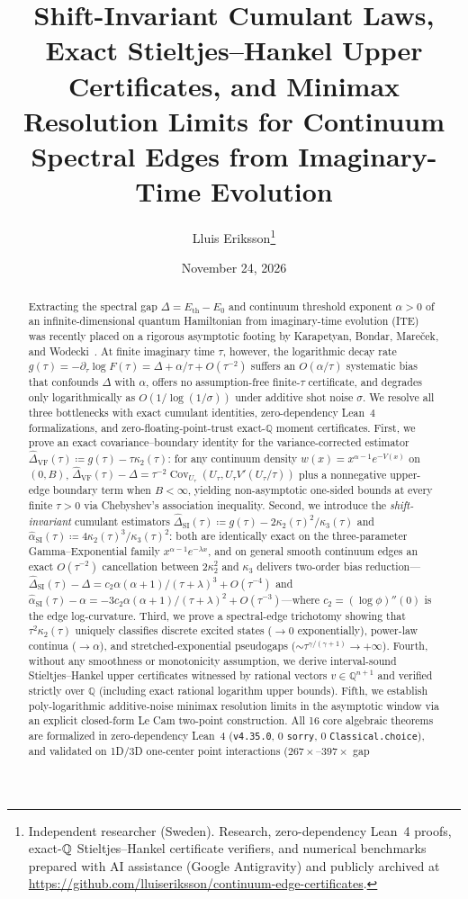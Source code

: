 \documentclass[11pt,a4paper]{article}
\title{\textbf{Shift-Invariant Cumulant Laws, Exact Stieltjes--Hankel Upper Certificates, and Minimax Resolution Limits for Continuum Spectral Edges from Imaginary-Time Evolution}}
\author{Lluis Eriksson\thanks{Independent researcher (Sweden). Research, zero-dependency Lean~4 proofs, exact-$\Q$ Stieltjes--Hankel certificate verifiers, and numerical benchmarks prepared with AI assistance (Google Antigravity) and publicly archived at \url{https://github.com/lluiseriksson/continuum-edge-certificates}.}}
\date{November 24, 2026}
\theoremstyle{definition}
\newcommand{\Q}{\mathbb{Q}}
\newcommand{\Cov}{\operatorname{Cov}}
\begin{document}
\maketitle

\begin{abstract}
Extracting the spectral gap $\Delta = E_{\mathrm{th}} - E_0$ and continuum threshold exponent $\alpha > 0$ of an infinite-dimensional quantum Hamiltonian from imaginary-time evolution (ITE) was recently placed on a rigorous asymptotic footing by Karapetyan, Bondar, Mare\v{c}ek, and Wodecki~\cite{Karapetyan2026Beyond}. At finite imaginary time $\tau$, however, the logarithmic decay rate $g(\tau) = -\partial_\tau \log F(\tau) = \Delta + \alpha/\tau + O(\tau^{-2})$ suffers an $O(\alpha/\tau)$ systematic bias that confounds $\Delta$ with $\alpha$, offers no assumption-free finite-$\tau$ certificate, and degrades only logarithmically as $O(1/\log(1/\sigma))$ under additive shot noise $\sigma$. We resolve all three bottlenecks with exact cumulant identities, zero-dependency Lean~4 formalizations, and zero-floating-point-trust exact-$\Q$ moment certificates. First, we prove an exact covariance--boundary identity for the variance-corrected estimator $\widehat{\Delta}_{\mathrm{VF}}(\tau) \coloneqq g(\tau) - \tau\kappa_2(\tau)$: for any continuum density $w(x) = x^{\alpha-1} e^{-V(x)}$ on $(0, B)$, $\widehat{\Delta}_{\mathrm{VF}}(\tau) - \Delta = \tau^{-2}\Cov_{U_\tau}(U_\tau, U_\tau V'(U_\tau/\tau))$ plus a nonnegative upper-edge boundary term when $B < \infty$, yielding non-asymptotic one-sided bounds at every finite $\tau > 0$ via Chebyshev's association inequality. Second, we introduce the \emph{shift-invariant} cumulant estimators $\widehat{\Delta}_{\mathrm{SI}}(\tau) \coloneqq g(\tau) - 2\kappa_2(\tau)^2/\kappa_3(\tau)$ and $\widehat{\alpha}_{\mathrm{SI}}(\tau) \coloneqq 4\kappa_2(\tau)^3/\kappa_3(\tau)^2$: both are identically exact on the three-parameter Gamma--Exponential family $x^{\alpha-1}e^{-\lambda x}$, and on general smooth continuum edges an exact $O(\tau^{-2})$ cancellation between $2\kappa_2^2$ and $\kappa_3$ delivers two-order bias reduction—$\widehat{\Delta}_{\mathrm{SI}}(\tau) - \Delta = c_2 \alpha(\alpha+1)/(\tau+\lambda)^3 + O(\tau^{-4})$ and $\widehat{\alpha}_{\mathrm{SI}}(\tau) - \alpha = -3c_2\alpha(\alpha+1)/(\tau+\lambda)^2 + O(\tau^{-3})$—where $c_2 = (\log\phi)''(0)$ is the edge log-curvature. Third, we prove a spectral-edge trichotomy showing that $\tau^2\kappa_2(\tau)$ uniquely classifies discrete excited states ($\to 0$ exponentially), power-law continua ($\to \alpha$), and stretched-exponential pseudogaps ($\sim \tau^{\gamma/(\gamma+1)} \to +\infty$). Fourth, without any smoothness or monotonicity assumption, we derive interval-sound Stieltjes--Hankel upper certificates witnessed by rational vectors $v \in \Q^{n+1}$ and verified strictly over $\Q$ (including exact rational logarithm upper bounds). Fifth, we establish poly-logarithmic additive-noise minimax resolution limits in the asymptotic window via an explicit closed-form Le Cam two-point construction. All 16 core algebraic theorems are formalized in zero-dependency Lean~4 (\texttt{v4.35.0}, 0 \texttt{sorry}, 0 \texttt{Classical.choice}), and validated on 1D/3D one-center point interactions ($267\times$--$397\times$ gap 
\end{abstract}
\end{document}
